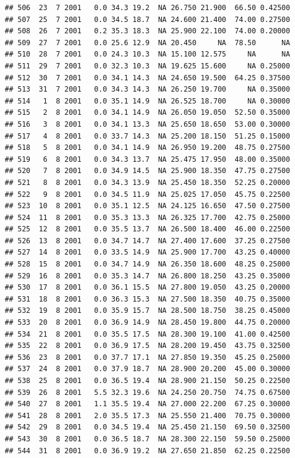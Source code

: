 \documentclass[
]{book}
\begin{document}
\begin{verbatim}
## 506  23  7 2001   0.0 34.3 19.2  NA 26.750 21.900  66.50 0.42500
## 507  25  7 2001   0.0 34.5 18.7  NA 24.600 21.400  74.00 0.27500
## 508  26  7 2001   0.2 35.3 18.3  NA 25.900 22.100  74.00 0.20000
## 509  27  7 2001   0.0 25.6 12.9  NA 20.450     NA  78.50      NA
## 510  28  7 2001   0.0 24.3 10.3  NA 15.100 12.575     NA      NA
## 511  29  7 2001   0.0 32.3 10.3  NA 19.625 15.600     NA 0.25000
## 512  30  7 2001   0.0 34.1 14.3  NA 24.650 19.500  64.25 0.37500
## 513  31  7 2001   0.0 34.3 14.3  NA 26.250 19.700     NA 0.35000
## 514   1  8 2001   0.0 35.1 14.9  NA 26.525 18.700     NA 0.30000
## 515   2  8 2001   0.0 34.1 14.9  NA 26.050 19.050  52.50 0.35000
## 516   3  8 2001   0.0 34.1 13.3  NA 25.650 18.650  53.00 0.30000
## 517   4  8 2001   0.0 33.7 14.3  NA 25.200 18.150  51.25 0.15000
## 518   5  8 2001   0.0 34.1 14.9  NA 26.950 19.200  48.75 0.27500
## 519   6  8 2001   0.0 34.3 13.7  NA 25.475 17.950  48.00 0.35000
## 520   7  8 2001   0.0 34.9 14.5  NA 25.900 18.350  47.75 0.27500
## 521   8  8 2001   0.0 34.3 13.9  NA 25.450 18.350  52.25 0.20000
## 522   9  8 2001   0.0 34.5 11.9  NA 25.025 17.050  45.75 0.22500
## 523  10  8 2001   0.0 35.1 12.5  NA 24.125 16.650  47.50 0.27500
## 524  11  8 2001   0.0 35.3 13.3  NA 26.325 17.700  42.75 0.25000
## 525  12  8 2001   0.0 35.5 13.7  NA 26.500 18.400  46.00 0.22500
## 526  13  8 2001   0.0 34.7 14.7  NA 27.400 17.600  37.25 0.27500
## 527  14  8 2001   0.0 33.5 14.9  NA 25.900 17.700  43.25 0.40000
## 528  15  8 2001   0.0 34.7 14.9  NA 26.350 18.600  48.25 0.25000
## 529  16  8 2001   0.0 35.3 14.7  NA 26.800 18.250  43.25 0.35000
## 530  17  8 2001   0.0 36.1 15.5  NA 27.800 19.050  43.25 0.20000
## 531  18  8 2001   0.0 36.3 15.3  NA 27.500 18.350  40.75 0.35000
## 532  19  8 2001   0.0 35.9 15.7  NA 28.500 18.750  38.25 0.45000
## 533  20  8 2001   0.0 36.9 14.9  NA 28.450 19.800  44.75 0.20000
## 534  21  8 2001   0.0 35.5 17.5  NA 28.300 19.100  41.00 0.42500
## 535  22  8 2001   0.0 36.9 17.5  NA 28.200 19.450  43.75 0.32500
## 536  23  8 2001   0.0 37.7 17.1  NA 27.850 19.350  45.25 0.25000
## 537  24  8 2001   0.0 37.9 18.7  NA 28.900 20.200  45.00 0.30000
## 538  25  8 2001   0.0 36.5 19.4  NA 28.900 21.150  50.25 0.22500
## 539  26  8 2001   5.5 32.3 19.6  NA 24.250 20.750  74.75 0.67500
## 540  27  8 2001   1.1 35.5 19.4  NA 27.000 22.200  67.25 0.30000
## 541  28  8 2001   2.0 35.5 17.3  NA 25.550 21.400  70.75 0.30000
## 542  29  8 2001   0.0 34.5 19.4  NA 25.450 21.150  69.50 0.32500
## 543  30  8 2001   0.0 36.5 18.7  NA 28.300 22.150  59.50 0.25000
## 544  31  8 2001   0.0 36.9 19.2  NA 27.650 21.850  62.25 0.22500

\end{verbatim}
\end{document}
